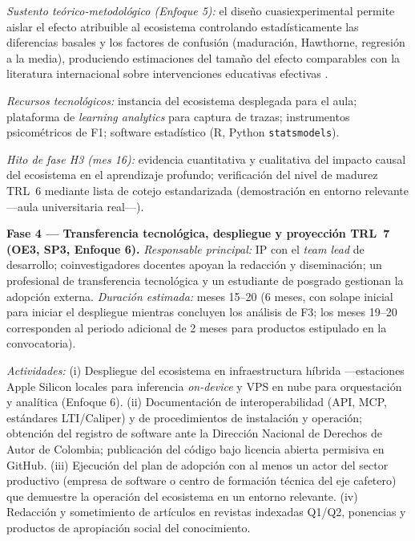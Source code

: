 \emph{Sustento teórico-metodológico (Enfoque 5):} el diseño cuasiexperimental
permite aislar el efecto atribuible al ecosistema controlando estadísticamente
las diferencias basales y los factores de confusión (maduración, Hawthorne,
regresión a la media), produciendo estimaciones del tamaño del efecto comparables
con la literatura internacional sobre intervenciones educativas efectivas
\cite{freeman2014active}.

\emph{Recursos tecnológicos:} instancia del ecosistema desplegada para el aula;
plataforma de \emph{learning analytics} para captura de trazas; instrumentos
psicométricos de F1; software estadístico (R, Python \texttt{statsmodels}).

\emph{Hito de fase H3 (mes 16):} evidencia cuantitativa y cualitativa del
impacto causal del ecosistema en el aprendizaje profundo; verificación del
nivel de madurez TRL~6 mediante lista de cotejo estandarizada (demostración en
entorno relevante —aula universitaria real—).

\medskip

\noindent\textbf{Fase 4 — Transferencia tecnológica, despliegue y proyección
TRL~7 (OE3, SP3, Enfoque 6).}
\emph{Responsable principal:} IP con el \emph{team lead} de desarrollo;
coinvestigadores docentes apoyan la redacción y diseminación; un profesional de
transferencia tecnológica y un estudiante de posgrado gestionan la adopción
externa. \emph{Duración estimada:} meses 15--20 (6 meses, con solape inicial
para iniciar el despliegue mientras concluyen los análisis de F3; los meses
19--20 corresponden al periodo adicional de 2 meses para productos estipulado en
la convocatoria).

\emph{Actividades:} (i) Despliegue del ecosistema en infraestructura híbrida
—estaciones Apple Silicon locales para inferencia \emph{on-device} y VPS en nube
para orquestación y analítica (Enfoque 6). (ii) Documentación de
interoperabilidad (API, MCP, estándares LTI/Caliper) y de procedimientos de
instalación y operación; obtención del registro de software ante la Dirección
Nacional de Derechos de Autor de Colombia; publicación del código bajo licencia
abierta permisiva en GitHub. (iii) Ejecución del plan de adopción con al menos
un actor del sector productivo (empresa de software o centro de formación técnica
del eje cafetero) que demuestre la operación del ecosistema en un entorno
relevante. (iv) Redacción y sometimiento de artículos en revistas indexadas
Q1/Q2, ponencias y productos de apropiación social del conocimiento.

